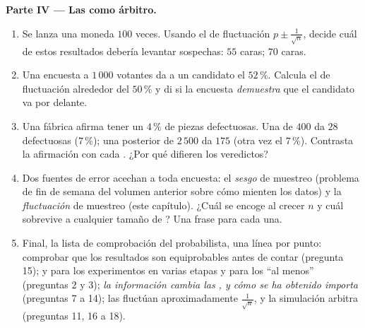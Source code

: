 \begin{problem}
\medskip
\noindent\textbf{Parte IV --- Las  como árbitro.}
\begin{enumerate}[resume]
  \item Se lanza una moneda $100$ veces. Usando el  de
        fluctuación $p \pm \frac{1}{\sqrt n}$, decide cuál de estos
        resultados debería levantar sospechas: $55$ caras; $70$ caras.
  \item Una encuesta a $1\,000$ votantes da a un candidato el $52\,\%$.
        Calcula el  de fluctuación alrededor del $50\,\%$ y di si
        la encuesta \emph{demuestra} que el candidato va por delante.
  \item Una fábrica afirma tener un $4\,\%$ de piezas defectuosas. Una
         de $400$ da $28$ defectuosas ($7\,\%$); una 
        posterior de $2\,500$ da $175$ (otra vez el $7\,\%$). Contrasta la
        afirmación con cada . ¿Por qué difieren los veredictos?
  \item Dos fuentes de error acechan a toda encuesta: el \emph{sesgo} de
        muestreo (problema de fin de semana del volumen anterior sobre
        cómo mienten los datos) y la \emph{fluctuación} de muestreo (este
        capítulo). ¿Cuál se encoge al crecer $n$ y cuál sobrevive a
        cualquier tamaño de ? Una frase para cada una.
  \item Final, la lista de comprobación del probabilista, una línea por
        punto: comprobar que los resultados son equiprobables antes de
        contar (pregunta 15);  y  para los
        experimentos en varias etapas y para los ``al menos'' (preguntas 2
        y 3); \emph{la información cambia las , y cómo se ha
        obtenido importa} (preguntas 7 a 14); las  fluctúan
        aproximadamente $\frac{1}{\sqrt n}$, y la simulación arbitra
        (preguntas 11, 16 a 18).
\end{enumerate}
\end{problem}

